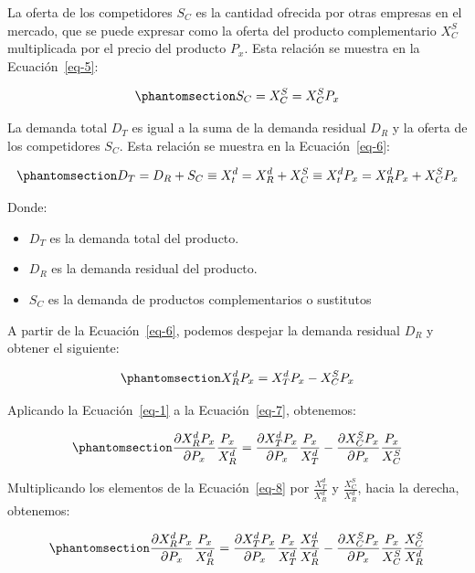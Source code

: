 \documentclass[
  doc,
  floatsintext,
  longtable,
  a4paper,
  nolmodern,
  notxfonts,
  notimes,
  12pt,
  colorlinks=true,linkcolor=blue,citecolor=blue,urlcolor=blue]{apa7}
\providecommand{\tightlist}{%
  \setlength{\itemsep}{0pt}\setlength{\parskip}{0pt}}
\begin{document}
La oferta de los competidores \(S_C\) es la cantidad ofrecida por otras
empresas en el mercado, que se puede expresar como la oferta del
producto complementario \(X_C^S\) multiplicada por el precio del
producto \(P_x\). Esta relación se muestra en la Ecuación~\ref{eq-5}:

\begin{equation}\protect\phantomsection\label{eq-5}{
S_C = X_C^S = X_C^S P_x
}\end{equation}

La demanda total \(D_T\) es igual a la suma de la demanda residual
\(D_R\) y la oferta de los competidores \(S_C\). Esta relación se
muestra en la Ecuación~\ref{eq-6}:

\begin{equation}\protect\phantomsection\label{eq-6}{
D_T = D_R + S_C \equiv X_t^d = X_R^d + X_C^S \equiv X_t^d P_x = X_R^d P_x + X_C^S P_x
}\end{equation}

Donde:

\begin{itemize}
\tightlist
\item
  \(D_T\) es la demanda total del producto.
\item
  \(D_R\) es la demanda residual del producto.
\item
  \(S_C\) es la demanda de productos complementarios o sustitutos
\end{itemize}

A partir de la Ecuación~\ref{eq-6}, podemos despejar la demanda residual
\(D_R\) y obtener el siguiente:

\begin{equation}\protect\phantomsection\label{eq-7}{
X_R^d P_x = X_T^d P_x - X_C^S P_x
}\end{equation}

Aplicando la Ecuación~\ref{eq-1} a la Ecuación~\ref{eq-7}, obtenemos:

\begin{equation}\protect\phantomsection\label{eq-8}{
\frac{\partial X_R^d P_x}{\partial P_x} \frac{P_x}{X_R^d} = \frac{\partial X_T^d P_x}{\partial P_x} \frac{P_x}{X_T^d} - \frac{\partial X_C^S P_x}{\partial P_x} \frac{P_x}{X_C^S}
}\end{equation}

Multiplicando los elementos de la Ecuación~\ref{eq-8} por
\(\frac{X_T^d}{X_R^d}\) y \(\frac{X_C^S}{X_R^d}\), hacia la derecha,
obtenemos:

\begin{equation}\protect\phantomsection\label{eq-9}{
\frac{\partial X_R^d P_x}{\partial P_x} \frac{P_x}{X_R^d} = \frac{\partial X_T^d P_x}{\partial P_x} \frac{P_x}{X_T^d} \frac{X_T^d}{X_R^d} - \frac{\partial X_C^S P_x}{\partial P_x} \frac{P_x}{X_C^S} \frac{X_C^S}{X_R^d}
}\end{equation}
\end{document}
